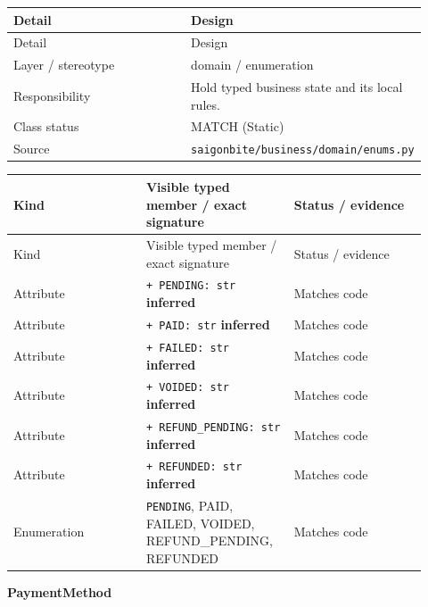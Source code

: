 \begin{longtable}{>{\raggedright\arraybackslash}p{0.4600\linewidth}>{\raggedright\arraybackslash}p{0.4600\linewidth}}
Detail & Design \\
\hline\endfirsthead
Detail & Design \\
\hline\endhead
Layer / stereotype & domain / \guillemotleft{}enumeration\guillemotright{} \\
Responsibility & Hold typed business state and its local rules. \\
Class status & MATCH (Static) \\
Source & \texttt{saigonbite/\allowbreak{}business/\allowbreak{}domain/\allowbreak{}enums.\allowbreak{}py} \\
\end{longtable}
\begin{longtable}{>{\raggedright\arraybackslash}p{0.3067\linewidth}>{\raggedright\arraybackslash}p{0.3067\linewidth}>{\raggedright\arraybackslash}p{0.3067\linewidth}}
Kind & Visible typed member / exact signature & Status / evidence \\
\hline\endfirsthead
Kind & Visible typed member / exact signature & Status / evidence \\
\hline\endhead
Attribute & \texttt{+ \texttt{PENDING}: str} \textbf{inferred} & Matches code \\
Attribute & \texttt{+ PAID: str} \textbf{inferred} & Matches code \\
Attribute & \texttt{+ FAILED: str} \textbf{inferred} & Matches code \\
Attribute & \texttt{+ VOIDED: str} \textbf{inferred} & Matches code \\
Attribute & \texttt{+ REFUND\_\allowbreak{}PENDING: str} \textbf{inferred} & Matches code \\
Attribute & \texttt{+ REFUNDED: str} \textbf{inferred} & Matches code \\
Enumeration & \texttt{PENDING}, PAID, FAILED, VOIDED, REFUND\_PENDING, REFUNDED & Matches code \\
\end{longtable}
\textbf{PaymentMethod}

